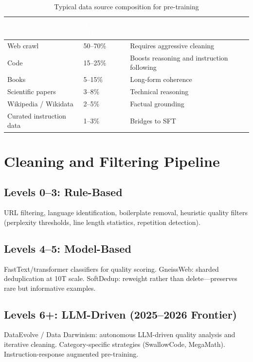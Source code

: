 \begin{table}[H]
\centering\small\sffamily
{}
\begin{tabular}{L{3cm}L{2.5cm}L{5cm}}
\toprule
{}\textcolor{white}{\textbf{Source}} & \textcolor{white}{\textbf{Typical Mix}} & \textcolor{white}{\textbf{Notes}} \\
\midrule
Web crawl & 50--70\% & Requires aggressive cleaning \\
Code & 15--25\% & Boosts reasoning and instruction following \\
Books & 5--15\% & Long-form coherence \\
Scientific papers & 3--8\% & Technical reasoning \\
Wikipedia / Wikidata & 2--5\% & Factual grounding \\
Curated instruction data & 1--3\% & Bridges to SFT \\
\bottomrule
\end{tabular}
\caption{Typical data source composition for pre-training}
\end{table}

\section{Cleaning and Filtering Pipeline}

\subsection{Levels 0--3: Rule-Based}
URL filtering, language identification, boilerplate removal, heuristic quality filters (perplexity thresholds, line length statistics, repetition detection).

\subsection{Levels 4--5: Model-Based}
FastText/transformer classifiers for quality scoring. GneissWeb: sharded deduplication at 10T scale. SoftDedup: reweight rather than delete---preserves rare but informative examples.

\subsection{Levels 6+: LLM-Driven (2025--2026 Frontier)}
DataEvolve / Data Darwinism: autonomous LLM-driven quality analysis and iterative cleaning. Category-specific strategies (SwallowCode, MegaMath). Instruction-response augmented pre-training.

